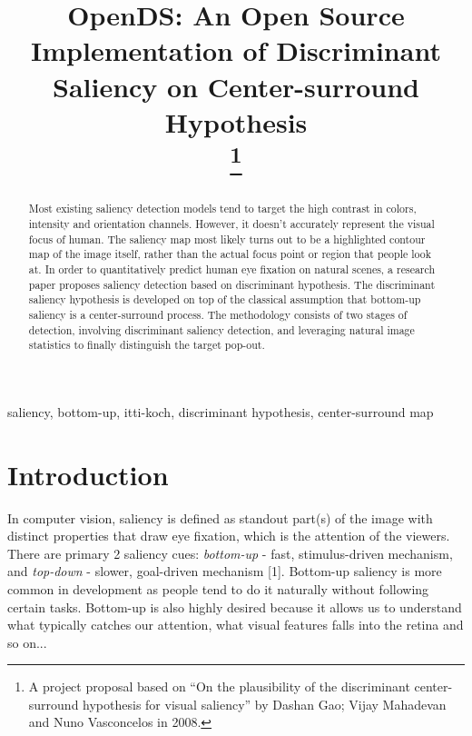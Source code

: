 \documentclass[conference]{IEEEtran}
\begin{document}
\title{OpenDS: An Open Source Implementation of Discriminant Saliency on Center-surround Hypothesis\\
\thanks{A project proposal based on “On the plausibility of the discriminant center-surround hypothesis for visual saliency” by Dashan Gao; Vijay Mahadevan and Nuno Vasconcelos in 2008.}
}

\author{
}

\maketitle

\begin{abstract}
Most existing saliency detection models tend to target the high contrast in colors, intensity and orientation channels. However, it doesn’t accurately represent the visual focus of human. The saliency map most likely turns out to be a highlighted contour map of the image itself, rather than the actual focus point or region that people look at. In order to quantitatively predict human eye fixation on natural scenes, a research paper proposes saliency detection based on discriminant hypothesis. The discriminant saliency hypothesis is developed on top of the classical assumption that bottom-up saliency is a center-surround process. The methodology consists of two stages of detection, involving discriminant saliency detection, and leveraging natural image statistics to finally distinguish the target pop-out.
\end{abstract}

\begin{IEEEkeywords}
saliency, bottom-up, itti-koch, discriminant hypothesis, center-surround map
\end{IEEEkeywords}

\section{Introduction}
In computer vision, saliency is defined as standout part(s) of the image with distinct properties that draw eye fixation, which is the attention of the viewers. There are primary 2 saliency cues: \textit{bottom-up} - fast, stimulus-driven mechanism, and \textit{top-down} - slower, goal-driven mechanism [1]. Bottom-up saliency is more common in development as people tend to do it naturally without following certain tasks. Bottom-up is also highly desired because it allows us to understand what typically catches our attention, what visual features falls into the retina and so on...
\end{document}

